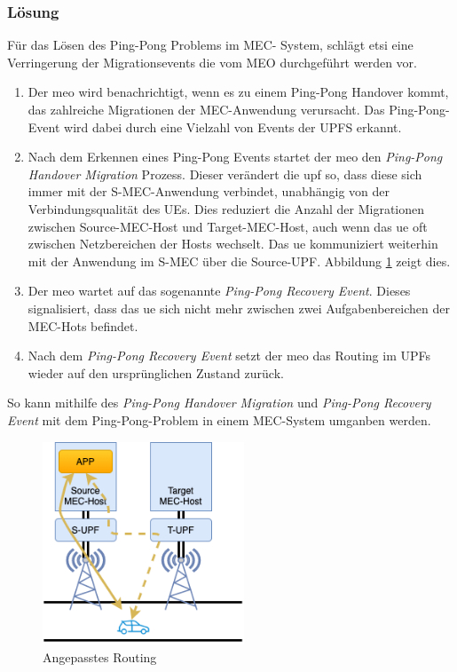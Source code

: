 \documentclass[runningheads]{llncs}
\numberwithin{figure}{section}
\begin{document}
\subsubsection{Lösung}
Für das Lösen des Ping-Pong Problems im MEC- System, schlägt \acrshort{etsi} eine Verringerung der Migrationsevents die vom MEO durchgeführt werden vor.
\begin{enumerate}
  \item Der \acrshort{meo} wird benachrichtigt, wenn es zu einem Ping-Pong Handover kommt, das zahlreiche Migrationen der MEC-Anwendung verursacht. Das
  Ping-Pong-Event wird dabei durch eine Vielzahl von Events der UPFS erkannt.
  \item Nach dem Erkennen eines Ping-Pong Events startet der \acrshort{meo} den \textit{Ping-Pong Handover Migration} Prozess. 
  Dieser verändert die \acrshort{upf}
  so, dass diese sich immer mit der S-MEC-Anwendung verbindet, unabhängig von der Verbindungsqualität des UEs. 
  Dies reduziert die Anzahl der Migrationen
  zwischen Source-MEC-Host und Target-MEC-Host, auch wenn das \acrshort{ue} oft zwischen Netzbereichen der Hosts wechselt. 
  Das \acrshort{ue} kommuniziert weiterhin
  mit der Anwendung im S-MEC über die Source-UPF. Abbildung \ref{fig:pingpongrouting} zeigt dies.
  \item Der \acrshort{meo} wartet auf das sogenannte \textit{Ping-Pong Recovery Event}. Dieses signalisiert, dass das \acrshort{ue} sich nicht mehr zwischen zwei
  Aufgabenbereichen der MEC-Hots befindet.
  \item Nach dem \textit{Ping-Pong Recovery Event} setzt der \acrshort{meo} das Routing im UPFs wieder auf den ursprünglichen Zustand zurück.
\end{enumerate}
So kann mithilfe des \textit{Ping-Pong Handover Migration} und \textit{Ping-Pong Recovery Event} mit dem Ping-Pong-Problem
in einem MEC-System umganben werden.
\begin{figure}
  \centering
  \includegraphics[width=6cm]{images/pingpongrouting.png}
  \caption{Angepasstes Routing}
  \label{fig:pingpongrouting}
\end{figure}
\newpage
\end{document}
